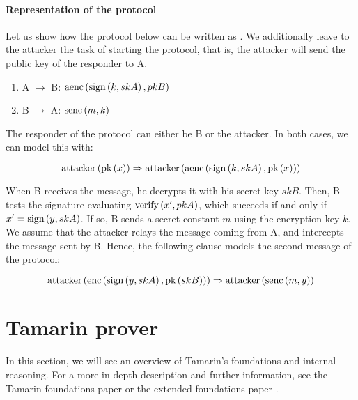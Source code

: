\paragraph{Representation of the protocol}

Let us show how the protocol below can be written as \Horncs{}. We additionally leave to the attacker the task of starting the protocol, that is, the attacker will send the public key of the responder to A.

\begin{enumerate}
    \label{enum:protocol}
    \item A $\rightarrow$ B: $\mbox{aenc}\left(\mbox{sign}\left(k, skA\right), pkB\right)$
    \item B $\rightarrow$ A: $\mbox{senc}\left(m, k\right)$
\end{enumerate}

The responder of the protocol can either be B or the attacker. In both cases, we can model this with:

\begin{equation}
    \mbox{attacker}\left(\mbox{pk}\left(x\right)\right) \Rightarrow \mbox{attacker}\left(\mbox{aenc}\left(\mbox{sign}\left(k, skA\right), \mbox{pk}\left(x\right)\right)\right)
\end{equation}

When B receives the message, he decrypts it with his secret key $skB$. Then, B tests the signature evaluating $\mbox{verify}\left(x', pkA\right)$, which succeeds if and only if $x' = \mbox{sign}\left(y, skA\right)$. If so, B sends a secret constant $m$ using the encryption key $k$. We assume that the attacker relays the message coming from A, and intercepts the message sent by B. Hence, the following clause models the second message of the protocol:

\begin{equation}
    \mbox{attacker}\left(\mbox{enc}\left(\mbox{sign}\left(y, skA\right), \mbox{pk}\left(skB\right)\right)\right) \Rightarrow \mbox{attacker}\left(\mbox{senc}\left(m, y\right)\right)
\end{equation}






\section{Tamarin prover}
\label{sec:tamarin-foundations}
In this section, we will see an overview of Tamarin's foundations and internal reasoning.
For a more in-depth description and further information, see the Tamarin foundations paper \cite{TamarinFoundations} or the extended foundations paper \cite{TamarinFoundationsExtended}.

